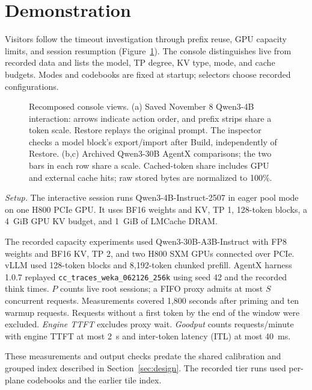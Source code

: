 \documentclass[conference]{IEEEtran}
\begin{document}
\section{Demonstration}
\label{sec:demo}
Visitors follow the timeout investigation through prefix reuse, GPU
capacity limits, and session resumption (Figure~\ref{fig:views}). The console
distinguishes live from recorded data and lists the model, TP degree, KV
type, mode, and cache budgets. Modes and codebooks are fixed at startup;
selectors choose recorded configurations.

\begin{figure}[!b]
\centering

\caption{Recomposed console views.
(a) Saved November 8 Qwen3-4B interaction: arrows indicate action order,
and prefix strips share a token scale. Restore replays the original prompt.
The inspector checks a model block's export/import after Build,
independently of Restore. (b,c) Archived Qwen3-30B AgentX comparisons;
the two bars in each row share a scale. Cached-token share includes GPU
and external cache hits; raw stored bytes are normalized to 100\%.}
\label{fig:views}
\end{figure}

\emph{Setup.} The interactive session runs Qwen3-4B-Instruct-2507 in eager
pool mode on one H800 PCIe GPU. It uses BF16 weights and KV, TP 1,
128-token blocks, a 4~GiB GPU KV budget, and 1~GiB of LMCache DRAM.

The recorded capacity experiments used Qwen3-30B-A3B-Instruct
with FP8 weights and BF16 KV, TP 2, and two H800 SXM GPUs connected over
PCIe. vLLM used 128-token blocks and 8,192-token chunked prefill.
AgentX harness 1.0.7 replayed \texttt{cc\_traces\_weka\_062126\_256k} using
seed 42 and the recorded think times. $P$ counts live root sessions; a FIFO
proxy admits at most $S$ concurrent requests. Measurements covered
1,800 seconds after priming and ten warmup requests. Requests without a
first token by the end of the window were excluded. \emph{Engine TTFT} excludes
proxy wait. \emph{Goodput} counts requests/minute with engine TTFT at most
2~s and inter-token latency (ITL) at most 40~ms.

These measurements and output checks predate the shared calibration and
grouped index described in Section~\ref{sec:design}. The recorded tier runs
used per-plane codebooks and the earlier tile index.
\end{document}
